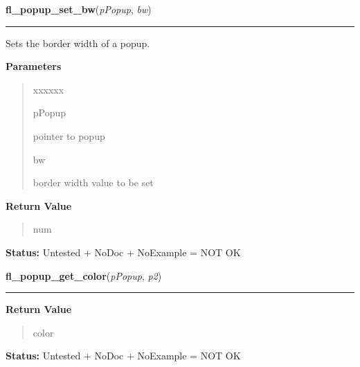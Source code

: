 \hspace{.8\funcindent}\begin{boxedminipage}{\funcwidth}

    \raggedright \textbf{fl\_popup\_set\_bw}(\textit{pPopup}, \textit{bw})

    \vspace{-1.5ex}

    \rule{\textwidth}{0.5\fboxrule}
\setlength{\parskip}{2ex}
    Sets the border width of a popup.

\setlength{\parskip}{1ex}
      \textbf{Parameters}
      \vspace{-1ex}

      \begin{quote}
        \begin{Ventry}{xxxxxx}

          \item[pPopup]

          pointer to popup

          \item[bw]

          border width value to be set

        \end{Ventry}

      \end{quote}

      \textbf{Return Value}
    \vspace{-1ex}

      \begin{quote}
      num

      \end{quote}

\textbf{Status:} Untested + NoDoc + NoExample = NOT OK



    \end{boxedminipage}

    \label{xformslib:library:fl_popup_get_color}

    \vspace{0.5ex}

\hspace{.8\funcindent}\begin{boxedminipage}{\funcwidth}

    \raggedright \textbf{fl\_popup\_get\_color}(\textit{pPopup}, \textit{p2})

    \vspace{-1.5ex}

    \rule{\textwidth}{0.5\fboxrule}
\setlength{\parskip}{2ex}
\setlength{\parskip}{1ex}
      \textbf{Return Value}
    \vspace{-1ex}

      \begin{quote}
      color

      \end{quote}

\textbf{Status:} Untested + NoDoc + NoExample = NOT OK



    \end{boxedminipage}

